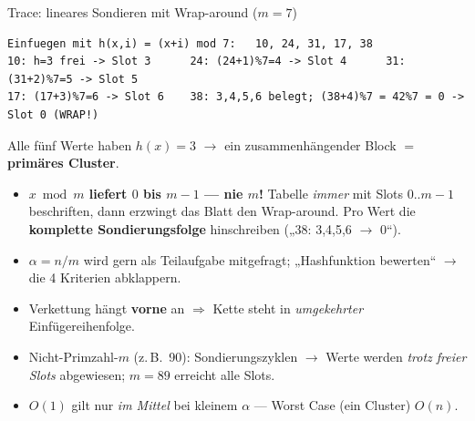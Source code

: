 \documentclass[10pt,a4paper]{article}
\begin{document}
\begin{defbox}{Trace: lineares Sondieren mit Wrap-around ($m=7$)}
\begin{Verbatim}[fontsize=\footnotesize,xleftmargin=6pt]
Einfuegen mit h(x,i) = (x+i) mod 7:   10, 24, 31, 17, 38
10: h=3 frei -> Slot 3      24: (24+1)%7=4 -> Slot 4      31: (31+2)%7=5 -> Slot 5
17: (17+3)%7=6 -> Slot 6    38: 3,4,5,6 belegt; (38+4)%7 = 42%7 = 0 -> Slot 0 (WRAP!)
\end{Verbatim}
\par\vspace{1pt}\centering
{}
\par\vspace{1pt}\raggedright\small
Alle fünf Werte haben $h(x)=3$ $\to$ ein zusammenhängender Block $=$ \textbf{primäres Cluster}.
\end{defbox}

\begin{fallenbox}
\small\begin{itemize}
  \item \textbf{$x \bmod m$ liefert $0$ bis $m{-}1$ — nie $m$!} Tabelle \emph{immer} mit Slots
        $0..m{-}1$ beschriften, dann erzwingt das Blatt den Wrap-around. Pro Wert die
        \textbf{komplette Sondierungsfolge} hinschreiben („38: 3,4,5,6 $\to$ 0``).
  \item $\alpha = n/m$ wird gern als Teilaufgabe mitgefragt; „Hashfunktion bewerten`` $\to$ die
        4 Kriterien abklappern.
  \item Verkettung hängt \textbf{vorne} an $\Rightarrow$ Kette steht in \emph{umgekehrter}
        Einfügereihenfolge.
  \item Nicht-Primzahl-$m$ (z.\,B.\ 90): Sondierungszyklen $\to$ Werte werden \emph{trotz freier
        Slots} abgewiesen; $m = 89$ erreicht alle Slots.
  \item $O(1)$ gilt nur \emph{im Mittel} bei kleinem $\alpha$ — Worst Case (ein Cluster) $O(n)$.
\end{itemize}
\end{fallenbox}
\end{document}
